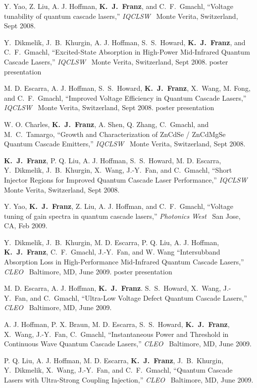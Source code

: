 \begin{list}{}{
  \setlength{\leftmargin}{0.25in}
  \setlength{\rightmargin}{0.25in}
  \setlength{\itemsep}{6pt}
}
\item Y. Yao, Z. Liu, A. J. Hoffman, \textbf{K.~J.~Franz}, and C.~F.~Gmachl, ``Voltage tunability of quantum cascade lasers,'' \emph{IQCLSW}~ Monte Verita, Switzerland, Sept 2008.
\item Y.~Dikmelik, J.~B.~Khurgin, A. J. Hoffman, S.~S.~Howard, \textbf{K.~J.~Franz}, and C.~F.~Gmachl, ``Excited-State Absorption in High-Power Mid-Infrared Quantum Cascade Lasers,'' \emph{IQCLSW}~ Monte Verita, Switzerland, Sept 2008. poster presentation
\item M. D. Escarra, A. J. Hoffman, S.~S.~Howard, \textbf{K.~J.~Franz}, X.~Wang, M. Fong, and  C.~F.~Gmachl, ``Improved Voltage Efficiency in Quantum Cascade Lasers,''  \emph{IQCLSW}~ Monte Verita, Switzerland, Sept 2008. poster presentation
\item W. O. Charles, \textbf{K.~J.~Franz}, A. Shen, Q. Zhang, C.~Gmachl, and M.~C.~Tamargo, ``Growth and Characterization of ZnCdSe / ZnCdMgSe Quantum Cascade Emitters,'' \emph{IQCLSW}~ Monte Verita, Switzerland, Sept 2008.
\item \textbf{K.~J.~Franz}, P. Q. Liu, A. J. Hoffman, S.~S.~Howard, M. D. Escarra, Y.~Dikmelik,  J.~B.~Khurgin, X.~Wang, \mbox{J.-Y.~Fan}, and C.~Gmachl, ``Short Injector Regions for  Improved Quantum Cascade Laser Performance,'' \emph{IQCLSW}~ Monte Verita,  Switzerland, Sept 2008. \enspace {}
\item Y. Yao, \textbf{K.~J.~Franz}, Z. Liu, A. J. Hoffman, and C.~F.~Gmachl, ``Voltage tuning of gain spectra in quantum cascade lasers,'' \emph{Photonics West}~ San Jose, CA, Feb 2009.
\item Y.~Dikmelik, J.~B.~Khurgin, M. D. Escarra, P. Q. Liu, A. J. Hoffman, \textbf{K.~J.~Franz}, C.~F.~Gmachl, \mbox{J.-Y.~Fan}, and W. Wang ``Intersubband Absorption Loss in High-Performance Mid-Infrared Quantum Cascade Lasers,'' \emph{CLEO}~ Baltimore, MD, June 2009. poster presentation
\item M. D. Escarra, A. J. Hoffman, \textbf{K.~J.~Franz}. S.~S.~Howard, X.~Wang, \mbox{J.-Y.~Fan}, and C.~Gmachl, ``Ultra-Low Voltage Defect Quantum Cascade Lasers,''  \emph{CLEO}~ Baltimore, MD, June 2009.
\item A. J. Hoffman, P. X. Braun, M. D. Escarra, S.~S.~Howard, \textbf{K.~J.~Franz}, X.~Wang, \mbox{J.-Y.~Fan}, C.~Gmachl, ``Instantaneous Power and Threshold in Continuous Wave Quantum Cascade Lasers,'' \emph{CLEO}~ Baltimore, MD, June 2009.
\item P. Q. Liu, A. J. Hoffman, M. D. Escarra, \textbf{K.~J.~Franz}, J.~B.~Khurgin, Y.~Dikmelik, X.~Wang, \mbox{J.-Y.~Fan}, and C.~F.~Gmachl, ``Quantum Cascade Lasers with Ultra-Strong Coupling Injection,'' \emph{CLEO}~ Baltimore, MD, June 2009.

\end{list}

